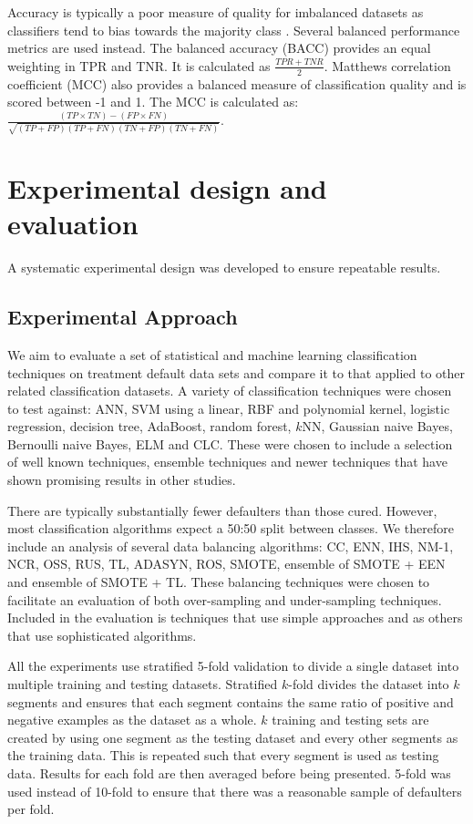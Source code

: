 \documentclass{sig-alternate-05-2015}
\begin{document}
	Accuracy is typically a poor measure of quality for imbalanced datasets as classifiers tend to bias towards the majority class \cite{Batista:2004:SBS:1007730.1007735, Chawla:2004:ESI:1007730.1007733}. Several balanced performance metrics are used instead. The balanced accuracy (BACC) provides an equal weighting in TPR and TNR. It is calculated as $\frac{TPR + TNR}{2}$. Matthews correlation coefficient (MCC) also provides a balanced measure of classification quality and is scored between -1 and 1. The MCC is calculated as: $\frac{(TP \times TN) - (FP \times FN)}{\sqrt{(TP + FP)(TP + FN)(TN + FP)(TN + FN)}}$.
	
	
	\section{Experimental design and evaluation}
	A systematic experimental design was developed to ensure repeatable results.
	\subsection{Experimental Approach}
	\label{method-approach}
	
	We aim to evaluate a set of statistical and machine learning classification techniques on treatment default data sets and compare it to that applied to other related classification datasets. A variety of classification techniques were chosen to test against: ANN, SVM using a linear, RBF and polynomial kernel, logistic regression, decision tree, AdaBoost, random forest, $k$NN, Gaussian naive Bayes, Bernoulli naive Bayes, ELM and CLC. These were chosen to include a selection of well known techniques, ensemble techniques and newer techniques that have shown promising results in other studies. 
	
	There are typically substantially fewer defaulters than those cured. However, most classification algorithms expect a 50:50 split between classes. We therefore include an analysis of several data balancing algorithms: CC, ENN, IHS, NM-1, NCR, OSS, RUS, TL, ADASYN, ROS, SMOTE, ensemble of SMOTE + EEN and ensemble of SMOTE + TL. These balancing techniques were chosen to facilitate an evaluation of both over-sampling and under-sampling techniques. Included in the evaluation is techniques that use simple approaches and as others that use sophisticated algorithms.
	
	All the experiments use stratified 5-fold validation to divide a single dataset into multiple training and testing datasets. Stratified $k$-fold divides the dataset into $k$ segments and ensures that each segment contains the same ratio of positive and negative examples as the dataset as a whole. $k$ training and testing sets are created by using one segment as the testing dataset and every other segments as the training data. This is repeated such that every segment is used as testing data. Results for each fold are then averaged before being presented. 5-fold was used instead of 10-fold to ensure that there was a reasonable sample of defaulters per fold.
	
\end{document}

